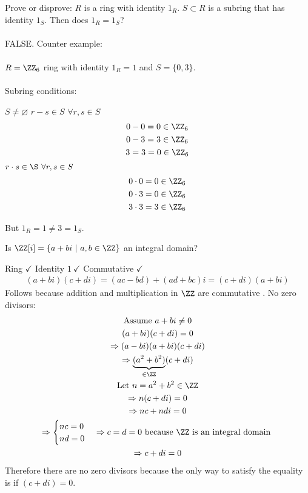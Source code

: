 \documentclass[class=scrartcl, crop=false]{standalone}
\begin{document}
\begin{example}
  Prove or disprove: $R$ is a ring with identity $1_R$. $S \subset R$ is a subring that has identity $1_S$. Then does $1_R = 1_S$?
  \\\\
  FALSE. Counter example:
  \\\\
  $R = \ZZ_6$ ring with identity $1_R = 1$ and $S = \{0, 3\}$.
  \\\\
  Subring conditions:
  \begin{enumerate}
    \ii $S \neq \varnothing$ 
    \ii $r - s \in S$ $\forall r, s \in S$ 
    \begin{gather*}
      0 - 0 = 0 \in \ZZ_6 \\
      0 - 3 = 3 \in \ZZ_6 \\
      3 = 3 = 0 \in \ZZ_6
    \end{gather*} 
    \ii $r \cdot s \in \S \ \forall r, s \in S$
     \begin{gather*}
      0 \cdot 0 = 0 \in \ZZ_6 \\
      0 \cdot 3 = 0 \in \ZZ_6 \\
      3 \cdot 3 = 3 \in \ZZ_6
    \end{gather*}
  \end{enumerate} 
  But $1_R = 1 \neq 3 = 1_S$.
\end{example} 

\begin{example}
  Is $\ZZ[i] = \{a + bi \ | \ a, b \in\ZZ\}$ an integral domain?
  \begin{enumerate}
    \ii Ring $\checkmark$ 
    \ii Identity $1 \ \checkmark$ 
    \ii Commutative $\checkmark$ 
    \begin{gather*}
      (a + bi)(c + di) = (ac - bd) + (ad + bc)i = (c + di)(a + bi)
    \end{gather*} 
    Follows because addition and multiplication in $\ZZ$ are commutative .
    \ii No zero divisors:
    \begin{gather*}
      \text{Assume } a + bi \neq 0 \\
      (a + bi)(c + di) = 0 \\
      \Rightarrow (a - bi)(a + bi)(c + di) \\
      \Rightarrow \underbrace{(a^2 + b^2)}_{\in \ZZ}(c + di) \\
      \text{Let} \ n = a^2 + b^2 \in \ZZ \\
      \Rightarrow n(c + di) = 0 \\
      \Rightarrow nc + ndi = 0 \\
      \Rightarrow
      \begin{cases}
        nc = 0 \\
        nd = 0
      \end{cases} \Rightarrow c = d = 0 \ \text{because} \ \ZZ \ \text{is an integral domain} \ 
      \\
      \Rightarrow c + di = 0
    \end{gather*} 
    Therefore there are no zero divisors because the only way to satisfy the equality is if $(c + di) = 0$.
  \end{enumerate} 
\end{example} 
\end{document}
